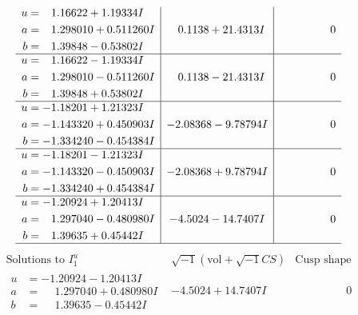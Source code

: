 \documentclass[1p]{elsarticle_modified}
\theoremstyle{definition}
\newcommand{\I}{\sqrt{-1}}
\begin{document}
$$\begin{array}{c|c|c}
\begin{aligned}
u &= \phantom{-}1.16622 + 1.19334 I \\
a &= \phantom{-}1.298010 + 0.511260 I \\
b &= \phantom{-}1.39848 - 0.53802 I\end{aligned}
 & \phantom{-}0.1138 + 21.4313 I & \phantom{-0.000000 } 0 \\ \hline\begin{aligned}
u &= \phantom{-}1.16622 - 1.19334 I \\
a &= \phantom{-}1.298010 - 0.511260 I \\
b &= \phantom{-}1.39848 + 0.53802 I\end{aligned}
 & \phantom{-}0.1138 - 21.4313 I & \phantom{-0.000000 } 0 \\ \hline\begin{aligned}
u &= -1.18201 + 1.21323 I \\
a &= -1.143320 + 0.450903 I \\
b &= -1.334240 - 0.454384 I\end{aligned}
 & -2.08368 - 9.78794 I & \phantom{-0.000000 } 0 \\ \hline\begin{aligned}
u &= -1.18201 - 1.21323 I \\
a &= -1.143320 - 0.450903 I \\
b &= -1.334240 + 0.454384 I\end{aligned}
 & -2.08368 + 9.78794 I & \phantom{-0.000000 } 0 \\ \hline\begin{aligned}
u &= -1.20924 + 1.20413 I \\
a &= \phantom{-}1.297040 - 0.480980 I \\
b &= \phantom{-}1.39635 + 0.45442 I\end{aligned}
 & -4.5024 - 14.7407 I & \phantom{-0.000000 } 0\\
 \hline 
 \end{array}$$\newpage$$\begin{array}{c|c|c}  
\text{Solutions to }I^u_{1}& \I (\text{vol} + \sqrt{-1}CS) & \text{Cusp shape}\\
 \hline 
\begin{aligned}
u &= -1.20924 - 1.20413 I \\
a &= \phantom{-}1.297040 + 0.480980 I \\
b &= \phantom{-}1.39635 - 0.45442 I\end{aligned}
 & -4.5024 + 14.7407 I & \phantom{-0.000000 } 0 \\ \hline\begin{aligned}

\end{aligned}
\end{array}$$
\end{document}
